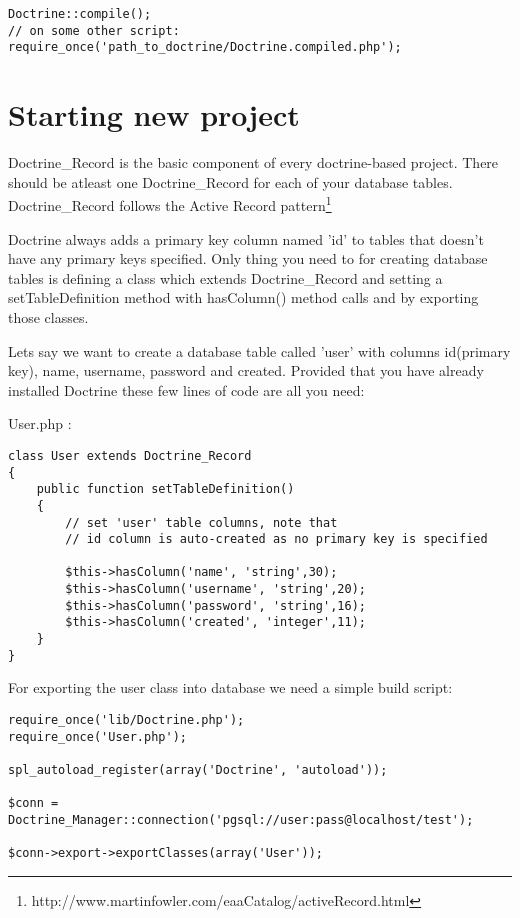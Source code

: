 \documentclass[11pt,a4paper]{report}
\begin{document}
\begin{verbatim}
Doctrine::compile();
// on some other script:
require_once('path_to_doctrine/Doctrine.compiled.php');
\end{verbatim}

\section{Starting new project}
Doctrine\_Record is the basic component of every doctrine-based project. There should be atleast one Doctrine\_Record for each of your database tables. Doctrine\_Record follows the Active Record pattern\footnote{http://www.martinfowler.com/eaaCatalog/activeRecord.html}

Doctrine always adds a primary key column named 'id' to tables that doesn't have any primary keys specified. Only thing you need to for creating database tables is defining a class which extends Doctrine\_Record and setting a setTableDefinition method with hasColumn() method calls and by exporting those classes.

Lets say we want to create a database table called 'user' with columns id(primary key), name, username, password and created. Provided that you have already installed Doctrine these few lines of code are all you need:

User.php :

\begin{verbatim}
class User extends Doctrine_Record
{
    public function setTableDefinition()
    {
        // set 'user' table columns, note that
        // id column is auto-created as no primary key is specified

        $this->hasColumn('name', 'string',30);
        $this->hasColumn('username', 'string',20);
        $this->hasColumn('password', 'string',16);
        $this->hasColumn('created', 'integer',11);
    }
}
\end{verbatim}

For exporting the user class into database we need a simple build script:

\begin{verbatim}
require_once('lib/Doctrine.php');
require_once('User.php');

spl_autoload_register(array('Doctrine', 'autoload'));

$conn = Doctrine_Manager::connection('pgsql://user:pass@localhost/test');

$conn->export->exportClasses(array('User'));
\end{verbatim}
\end{document}
